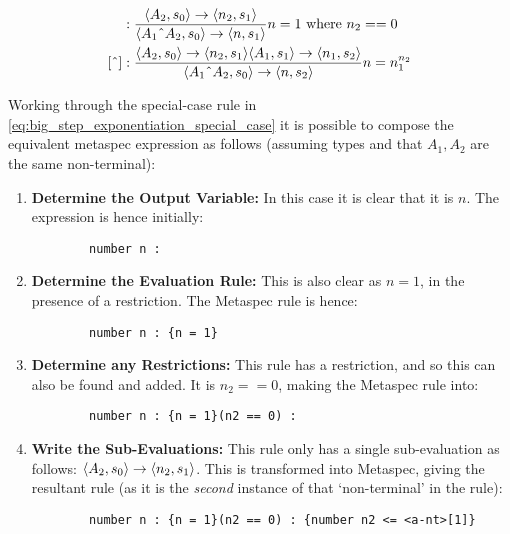 \begin{align}
    [\string^] &: \frac{\la A_2, s_0 \ra \to \la n_2, s_1 \ra}
    {\la A_1 \string^ A_2, s_0 \ra \to \la n, s_1 \ra} n = 1 \text{ where } n_2 == 0 \label{eq:big_step_exponentiation_special_case} \\
    [\string^] &: \frac{\la A_2, s_0 \ra \to \la n_2, s_1 \ra \la A_1, s_1 \ra \to \la n_1, s_2 \ra}{\la A_1 \string^ A_2, s_0 \ra \to \la n, s_2 \ra} n = n_1^{n_2} \label{eq:big_step_exponentiation_base_case}
\end{align}

Working through the special-case rule in \autoref{eq:big_step_exponentiation_special_case} it is possible to compose the equivalent \gls{metaspec} expression as follows (assuming types and that $A_1, A_2$ are the same non-terminal): 
\begin{enumerate}
    \item \textbf{Determine the Output Variable:} In this case it is clear that it is $n$. 
    The expression is hence initially:
    \begin{verbatim}
        number n : 
    \end{verbatim}
    \item \textbf{Determine the Evaluation Rule:} This is also clear as $n = 1$, in the presence of a restriction.
    The Metaspec rule is hence:
    \begin{verbatim}
        number n : {n = 1}
    \end{verbatim}
    \item \textbf{Determine any Restrictions:} This rule has a restriction, and so this can also be found and added. 
    It is $n_2 == 0$, making the Metaspec rule into:
    \begin{verbatim}
        number n : {n = 1}(n2 == 0) : 
    \end{verbatim}
    \item \textbf{Write the Sub-Evaluations:} This rule only has a single sub-evaluation as follows: $\langle A_2, s_0 \rangle \to \langle n_2, s_1 \rangle$.
    This is transformed into Metaspec, giving the resultant rule (as it is the \textit{second} instance of that `non-terminal' in the rule):
    \begin{verbatim}
        number n : {n = 1}(n2 == 0) : {number n2 <= <a-nt>[1]}
    \end{verbatim}
\end{enumerate}

